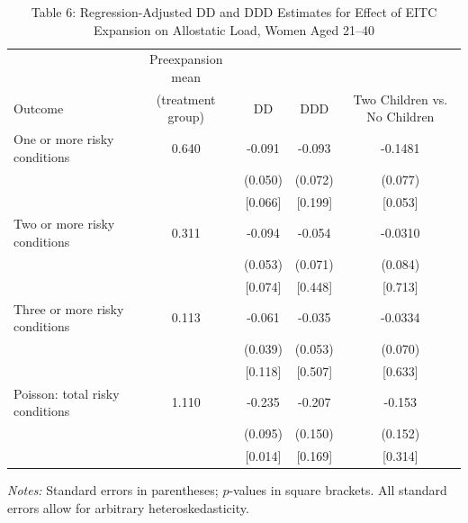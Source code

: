 \begin{table}[htbp]
\centering
\caption{Table 6: Regression-Adjusted DD and DDD Estimates for Effect of EITC Expansion on Allostatic Load, Women Aged 21--40}
\begin{tabular}{lcccc}
\toprule
 & Preexpansion mean & & & \\
Outcome & (treatment group) & DD & DDD & Two Children vs. No Children \\
\midrule
One or more risky conditions & 0.640 & -0.091 & -0.093  & -0.1481 \\
 &  & (0.050) & (0.072) & (0.077) \\
 &  & [0.066] & [0.199] & [0.053] \\
\addlinespace
Two or more risky conditions & 0.311 & -0.094 & -0.054  & -0.0310 \\
 &  & (0.053) & (0.071) & (0.084) \\
 &  & [0.074] & [0.448] & [0.713] \\
\addlinespace
Three or more risky conditions & 0.113 & -0.061 & -0.035  & -0.0334 \\
 &  & (0.039) & (0.053) & (0.070) \\
 &  & [0.118] & [0.507] & [0.633] \\
\addlinespace
Poisson: total risky conditions & 1.110 & -0.235 & -0.207 & -0.153 \\
 &  & (0.095) & (0.150) & (0.152) \\
 &  & [0.014] & [0.169] & [0.314] \\
\bottomrule
\end{tabular}
\begin{minipage}{\linewidth}
\smallskip\footnotesize
\textit{Notes:} Standard errors in parentheses; $p$-values in square brackets.
 All standard errors allow for arbitrary heteroskedasticity.
\end{minipage}
\end{table}

